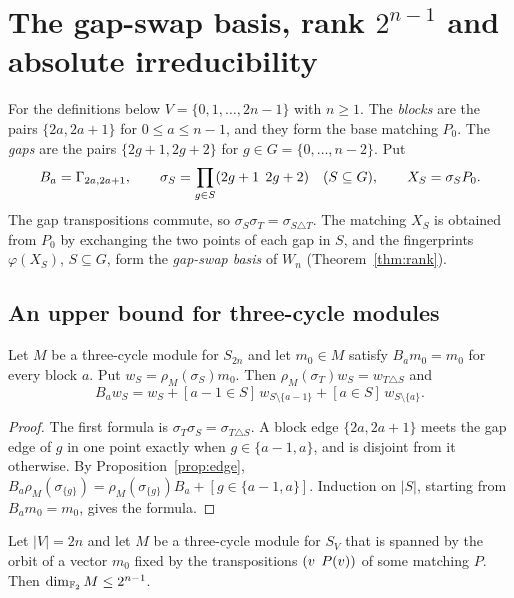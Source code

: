 \section{The gap-swap basis, rank \texorpdfstring{$2^{n-1}$}{2\textasciicircum(n-1)} and absolute irreducibility}\label{sec:basis}

For the definitions below $V=\{0,1,\dots,2n-1\}$ with $n\ge1$. The \emph{blocks} are the pairs $\{2a,2a+1\}$ for $0\le a\le n-1$, and they form the base matching $P_0$. The \emph{gaps} are the pairs $\{2g+1,2g+2\}$ for $g\in G=\{0,\dots,n-2\}$. Put
\[
B_a=\Gamma_{2a,2a+1},\qquad \sigma_S=\prod_{g\in S}(2g+1\;\,2g+2)\quad(S\subseteq G),\qquad X_S=\sigma_S P_0 .
\]
The gap transpositions commute, so $\sigma_S\sigma_T=\sigma_{S\triangle T}$. The matching $X_S$ is obtained from $P_0$ by exchanging the two points of each gap in $S$, and the fingerprints $\varphi(X_S)$, $S\subseteq G$, form the \emph{gap-swap basis} of $W_n$ (Theorem~\ref{thm:rank}).

\subsection{An upper bound for three-cycle modules}

\begin{proposition}\label{prop:Bw}
Let $M$ be a three-cycle module for $S_{2n}$ and let $m_0\in M$ satisfy $B_{a}m_0=m_0$ for every block $a$. Put $w_S=\rho_M(\sigma_S)m_0$. Then $\rho_M(\sigma_T)w_S=w_{T\triangle S}$ and
\[
B_{a}w_S=w_S+[a-1\in S]\,w_{S\setminus\{a-1\}}+[a\in S]\,w_{S\setminus\{a\}} .
\]
\end{proposition}

\begin{proof}
The first formula is $\sigma_T\sigma_S=\sigma_{T\triangle S}$. A block edge $\{2a,2a+1\}$ meets the gap edge of $g$ in one point exactly when $g\in\{a-1,a\}$, and is disjoint from it otherwise. By Proposition~\ref{prop:edge}, $B_a\rho_M(\sigma_{\{g\}})=\rho_M(\sigma_{\{g\}})B_a+[g\in\{a-1,a\}]$. Induction on $|S|$, starting from $B_{a}m_0=m_0$, gives the formula.
\end{proof}

\begin{theorem}\label{thm:upper}
Let $|V|=2n$ and let $M$ be a three-cycle module for $S_V$ that is spanned by the orbit of a vector $m_0$ fixed by the transpositions $(v\;\,P(v))$ of some matching $P$. Then $\dim_{\mathbb{F}_2}M\le 2^{n-1}$.
\end{theorem}

